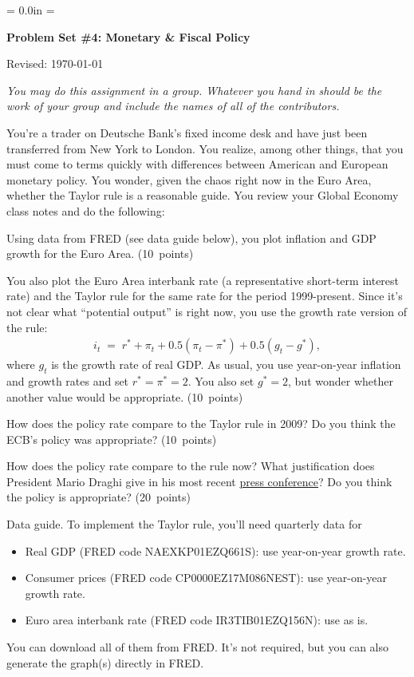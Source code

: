 \documentclass[12pt]{exam}
\def\HeadName{Problem Set \#4}
\begin{document}
\parindent = 0.0in
\parskip = \bigskipamount
\thispagestyle{empty}%
\Head

\centerline{\large \bf \HeadName: Monetary \& Fiscal Policy}
\centerline{Revised:  \today}

\medskip
{\it You may do this assignment in a group.
Whatever you hand in should be the work of your group
and include the names of all of the contributors.}

\begin{questions}
You're a trader on Deutsche Bank's fixed income desk
and have just been transferred from New York to London.
You realize, among other things, that you must come
to terms quickly with differences between American and European monetary policy.
You wonder, given the chaos right now in the Euro Area, whether
the Taylor rule is a reasonable guide.
You review your Global Economy class notes and do the following:
\begin{parts}
\item Using data from FRED (see data guide below),
you plot inflation and GDP growth for the Euro Area.
(10~points)
\item You also plot the Euro Area interbank rate (a representative short-term interest rate)
and the Taylor rule for the same rate for the period 1999-present.
Since it's not clear what ``potential output'' is right now,
you use the growth rate version of the rule:
\begin{eqnarray*}
    i_t  \;=\;  r^* + \pi_t + 0.5 (\pi_t - \pi^*)
            + 0.5 (g_t - g^*)   ,
\end{eqnarray*}
where $g_t$ is the growth rate of real GDP.
As usual, you use year-on-year inflation and growth rates
and set $r^* = \pi^* = 2$.
You also set $g^* = 2$, but wonder whether another value would be appropriate.
(10~points)
\item How does the policy rate compare to the Taylor rule in 2009?
Do you think the ECB's policy was appropriate?
(10~points)
\item How does the policy rate compare to the rule now?
What justification does President Mario Draghi give in his most recent
\href{http://www.ecb.europa.eu/press/pressconf/2013/html/index.en.html}{press conference}?
Do you think the policy is appropriate?
(20~points)
\end{parts}
Data guide.  To implement the Taylor rule,
you'll need quarterly data for
\begin{itemize}
\item Real GDP (FRED code NAEXKP01EZQ661S):  use year-on-year growth rate.
\item Consumer prices (FRED code CP0000EZ17M086NEST):  use year-on-year growth rate.
\item Euro area interbank rate (FRED code IR3TIB01EZQ156N):  use as is.
\end{itemize}
You can download all of them from FRED.
It's not required, but you can also generate the graph(s) directly in FRED.


\end{questions}
\end{document}

